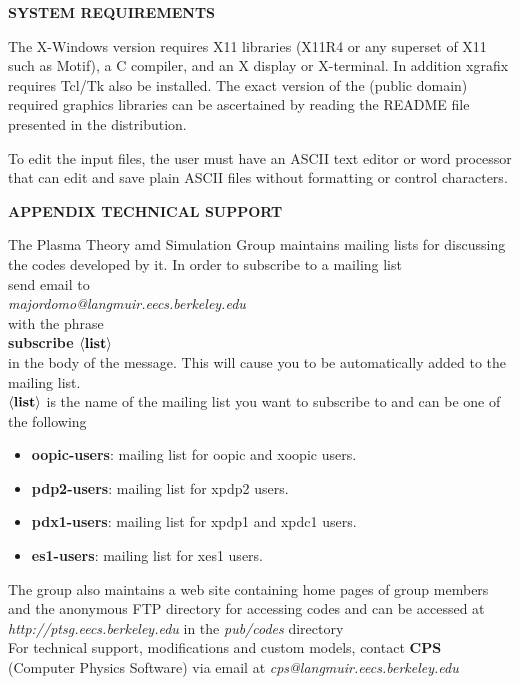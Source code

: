 \newpage
\noindent
\begin{appendix}
\begin{section}
{\bf SYSTEM REQUIREMENTS}

\noindent
The X-Windows version requires X11 libraries (X11R4 or any superset of
X11 such as Motif), a C compiler, and an X display or X-terminal. In
addition xgrafix requires Tcl/Tk also be installed. The exact version of
the (public domain) required graphics libraries can be ascertained by 
reading the README file presented in the distribution.

To edit the input files, the user must have an ASCII text editor or
word processor that can edit and save plain ASCII files without
formatting or control characters.
\end{section}

\newpage
\noindent
\begin{section}
{\bf APPENDIX TECHNICAL SUPPORT}

The Plasma Theory amd Simulation Group maintains mailing lists for discussing
the codes developed by it. In order to subscribe to a mailing list\\
send email to\\
{\em  majordomo@langmuir.eecs.berkeley.edu} \\
with the phrase \\
{\bf subscribe $\langle {\rm {\bf list}} \rangle$}\\
in the body of the message.  This will cause you
to be automatically added to the mailing list.\\
{\bf $\langle {\rm {\bf list}} \rangle$} is the name of the mailing list 
you want to subscribe to and can be one of the following 
\begin {itemize}
\item {\bf oopic-users}: mailing list for oopic and xoopic users.
\item {\bf pdp2-users}: mailing list for xpdp2 users.
\item {\bf pdx1-users}: mailing list for xpdp1 and xpdc1 users.
\item {\bf es1-users}: mailing list for xes1 users.
\end{itemize}

The group also maintains a web site containing home pages of group
members and the anonymous FTP directory for accessing codes and can
be  accessed at\\
 {\em http://ptsg.eecs.berkeley.edu} in the {\em pub/codes} directory\\

For technical support, modifications and custom models, contact
{\bf CPS} (Computer Physics Software) via email at 
{\em cps@langmuir.eecs.berkeley.edu}
\end{section}
\end{appendix}

